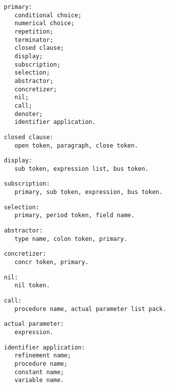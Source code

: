 \documentclass [a4paper,12pt,fleqn]{article}
\begin{document}
\begin{letterlist}
\item
\begin{verbatim}
primary:
   conditional choice;
   numerical choice;
   repetition;
   terminator;
   closed clause;
   display;
   subscription;
   selection;
   abstractor;
   concretizer;
   nil;
   call;
   denoter;
   identifier application.
\end{verbatim}
\item
\begin{verbatim}
closed clause:
   open token, paragraph, close token.
\end{verbatim}
\item
\begin{verbatim}
display:
   sub token, expression list, bus token.
\end{verbatim}
\item
\begin{verbatim}
subscription:
   primary, sub token, expression, bus token.
\end{verbatim}
\item
\begin{verbatim}
selection:
   primary, period token, field name.
\end{verbatim}
\item
\begin{verbatim}
abstractor:
   type name, colon token, primary.
\end{verbatim}
\item
\begin{verbatim}
concretizer:
   concr token, primary.
\end{verbatim}
\item
\begin{verbatim}
nil:
   nil token.
\end{verbatim}
\item
\begin{verbatim}
call:
   procedure name, actual parameter list pack.
\end{verbatim}
\item
\begin{verbatim}
actual parameter:
   expression.
\end{verbatim}
\item
\begin{verbatim}
identifier application:
   refinement name;
   procedure name;
   constant name;
   variable name.
\end{verbatim}
\end{letterlist}
\end{document}
